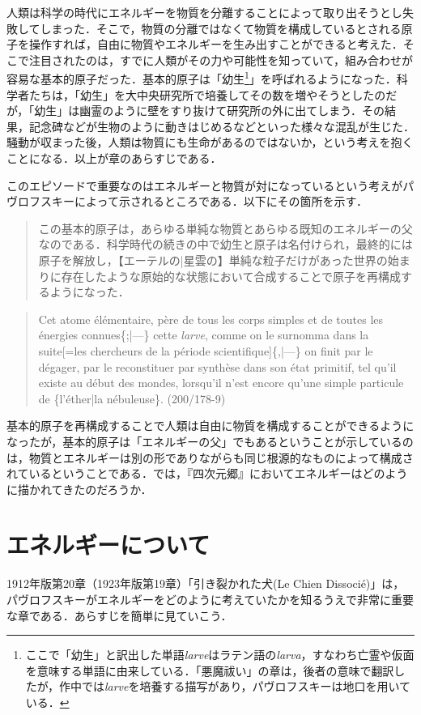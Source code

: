 人類は科学の時代にエネルギーを物質を分離することによって取り出そうとし失敗してしまった．そこで，物質の分離ではなくて物質を構成しているとされる原子を操作すれば，自由に物質やエネルギーを生み出すことができると考えた．そこで注目されたのは，すでに人類がその力や可能性を知っていて，組み合わせが容易な基本的原子だった．基本的原子は「幼生\footnote{ここで「幼生」と訳出した単語\emph{larve}はラテン語の\emph{larva}，すなわち亡霊や仮面を意味する単語に由来している．「悪魔祓い」の章は，後者の意味で翻訳したが，作中では\emph{larve}を培養する描写があり，パヴロフスキーは地口を用いている．}」を呼ばれるようになった．科学者たちは，「幼生」を大中央研究所で培養してその数を増やそうとしたのだが，「幼生」は幽霊のように壁をすり抜けて研究所の外に出てしまう．その結果，記念碑などが生物のように動きはじめるなどといった様々な混乱が生じた．騒動が収まった後，人類は物質にも生命があるのではないか，という考えを抱くことになる．以上が章のあらすじである．

このエピソードで重要なのはエネルギーと物質が対になっているという考えがパヴロフスキーによって示されるところである．以下にその箇所を示す．
\begin{quote}
この基本的原子は，あらゆる単純な物質とあらゆる既知のエネルギーの父なのである．科学時代の続きの中で幼生と原子は名付けられ，最終的には原子を解放し，【エーテルの|星雲の】単純な粒子だけがあった世界の始まりに存在したような原始的な状態において合成することで原子を再構成するようになった．
\end{quote}
\begin{quote}
  Cet atome élémentaire, père de tous les corps simples et de toutes les énergies connues\{;|---\} cette \emph{larve}, comme on le surnomma dans la suite[=les chercheurs de la période scientifique]\{,|---\} on finit par le dégager, par le reconstituer par synthèse dans son état primitif, tel qu'il existe au début des mondes, lorsqu'il n'est encore qu'une simple particule de \{l'éther|la nébuleuse\}. (200/178-9)
\end{quote}
基本的原子を再構成することで人類は自由に物質を構成することができるようになったが，基本的原子は「エネルギーの父」でもあるということが示しているのは，物質とエネルギーは別の形でありながらも同じ根源的なものによって構成されているということである．では，『四次元郷』においてエネルギーはどのように描かれてきたのだろうか．

\section{エネルギーについて}

1912年版第20章（1923年版第19章）「引き裂かれた犬(Le Chien Dissocié)」は，パヴロフスキーがエネルギーをどのように考えていたかを知るうえで非常に重要な章である．あらすじを簡単に見ていこう．

